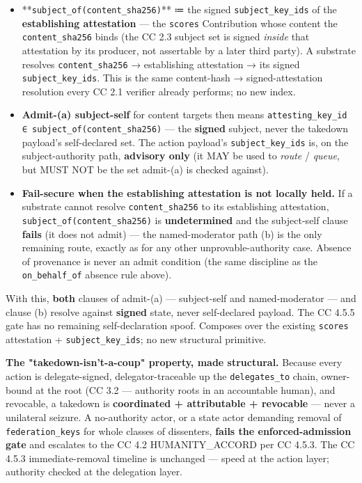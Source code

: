 \documentclass[11pt]{article}
\begin{document}
\begin{itemize}\setlength\itemsep{0pt}
\item **\texttt{subject\_of(content\_sha256)}** ≔ the signed \texttt{subject\_key\_ids} of the \textbf{establishing attestation} — the \texttt{scores} Contribution whose content the \texttt{content\_sha256} binds (the CC 2.3 subject set is signed \textit{inside} that attestation by its producer, not assertable by a later third party). A substrate resolves \texttt{content\_sha256} → establishing attestation → its signed \texttt{subject\_key\_ids}. This is the same content-hash → signed-attestation resolution every CC 2.1 verifier already performs; no new index.
\item \textbf{Admit-(a) subject-self} for content targets then means \texttt{attesting\_key\_id ∈ subject\_of(content\_sha256)} — the \textbf{signed} subject, never the takedown payload's self-declared set. The action payload's \texttt{subject\_key\_ids} is, on the subject-authority path, \textbf{advisory only} (it MAY be used to \textit{route} / \textit{queue}, but MUST NOT be the set admit-(a) is checked against).
\item \textbf{Fail-secure when the establishing attestation is not locally held.} If a substrate cannot resolve \texttt{content\_sha256} to its establishing attestation, \texttt{subject\_of(content\_sha256)} is \textbf{undetermined} and the subject-self clause \textbf{fails} (it does not admit) — the named-moderator path (b) is the only remaining route, exactly as for any other unprovable-authority case. Absence of provenance is never an admit condition (the same discipline as the \texttt{on\_behalf\_of} absence rule above).
\end{itemize}


With this, \textbf{both} clauses of admit-(a) — subject-self and named-moderator — and clause (b) resolve against \textbf{signed} state, never self-declared payload. The CC 4.5.5 gate has no remaining self-declaration spoof. Composes over the existing \texttt{scores} attestation + \texttt{subject\_key\_ids}; no new structural primitive.


\textbf{The "takedown-isn't-a-coup" property, made structural.} Because every action is delegate-signed, delegator-traceable up the \texttt{delegates\_to} chain, owner-bound at the root (CC 3.2 — authority roots in an accountable human), and revocable, a takedown is \textbf{coordinated + attributable + revocable} — never a unilateral seizure. A no-authority actor, or a state actor demanding removal of \texttt{federation\_keys} for whole classes of dissenters, \textbf{fails the enforced-admission gate} and escalates to the CC 4.2 HUMANITY\_ACCORD per CC 4.5.3. The CC 4.5.3 immediate-removal timeline is unchanged — speed at the action layer; authority checked at the delegation layer.
\end{document}
